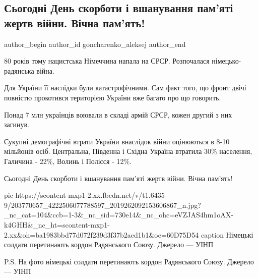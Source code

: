  
 
 
 
 
 
\subsection{Сьогодні День скорботи і вшанування пам'яті жертв війни. Вічна пам'ять!}
\label{sec:22_06_2021.fb.goncharenko_aleksej.1.vov_22_jun_pamjat}
\ifcmt
 author_begin
   author_id goncharenko_aleksej
 author_end
\fi

80 років тому нацистська Німеччина напала на СРСР. Розпочалася німецько-радянська війна. 

Для України її наслідки були катастрофічними. Сам факт того, що фронт двічі
повністю прокотився територією України вже багато про що говорить. 

Понад 7 млн українців воювали в складі армій СРСР, кожен другий з них загинув. 

Сукупні демографічні втрати України внаслідок війни оцінюються в 8-10 мільйонів
осіб. Центральна, Південна і Східна Україна втратила 30\% населення, Галичина -
22\%, Волинь і Полісся - 12\%.

Сьогодні День скорботи і вшанування пам'яті жертв війни. Вічна пам'ять!

\ifcmt
  pic https://scontent-mxp1-2.xx.fbcdn.net/v/t1.6435-9/203770657_4222506077788597_2019262092153606867_n.jpg?_nc_cat=104&ccb=1-3&_nc_sid=730e14&_nc_ohc=eVZJAS4hm1oAX-k4GHH&_nc_ht=scontent-mxp1-2.xx&oh=ba1983bbd77d072f239d3f37b2aed1b1&oe=60D75D54
	caption Німецькі солдати перетинають кордон Радянського Союзу. Джерело — УІНП
\fi

P.S. На фото німецькі солдати перетинають кордон Радянського Союзу. Джерело — УІНП
